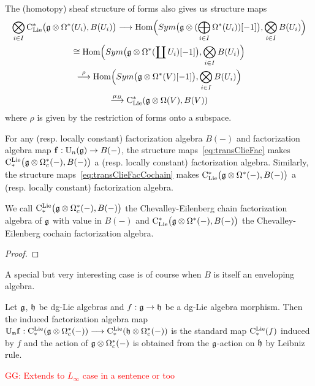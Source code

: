 \documentclass[11pt]{amsart}
\numberwithin{equation}{section}
\def\greg{\textcolor{red}{GG: }\textcolor{red}}
\begin{document}
\smallskip

The (homotopy) sheaf structure of forms also gives us structure maps
\begin{multline}\label{eq:transClieFacCochain}
 \bigotimes_{i\in I} {\rm C}_{\rm Lie}^*\big(\mathfrak g \otimes \Omega^*(U_i), B(U_i) \big) \longrightarrow
  {\rm Hom}\Big(Sym\big(\mathfrak g\otimes (\bigoplus_{i\in I}  \Omega^*(U_i))[-1]\big),  \bigotimes\limits_{i\in I} B(U_i) \Big) \\
 \cong {\rm Hom}\Big(Sym\big(\mathfrak g\otimes \Omega^*(\coprod U_i)[-1]\big), \bigotimes\limits_{i\in I} B(U_i) \Big) \\
 \stackrel{\rho}\longrightarrow {\rm Hom}\Big(Sym\big(\mathfrak g\otimes \Omega^*(V)[-1]\big), \bigotimes\limits_{i\in I} B(U_i) \Big) \\
 \stackrel{\mu_B}\longrightarrow 
  {\rm C}_{\rm Lie}^*(\mathfrak g\otimes \Omega (V), B(V))
\end{multline}
where $\rho$ is given by the restriction of forms onto a subspace. 
\begin{lmm}\label{L:ClieFacDef} For any (resp. locally constant) factorization algebra $B(-)$ and factorization algebra map $\mathbf{f}:\mathbb U_n(\mathfrak g) \to B(-)$, 
 the structure maps~\eqref{eq:transClieFac} makes $ {\rm C}^{\rm Lie}_*\big(\mathfrak g \otimes \Omega^*_c(-), B(-) \big)$ a (resp. locally constant) factorization algebra.
 Similarly, the structure maps~\eqref{eq:transClieFacCochain} makes 
 $ {\rm C}_{\rm Lie}^*\big(\mathfrak g \otimes \Omega^*(-), B(-) \big)$ a (resp. locally constant) factorization algebra.
\end{lmm}
\begin{dfn}\label{dfn:CEofFact}
We {call   ${\rm C}^{\rm Lie}_*\big(\mathfrak g \otimes \Omega^*_c(-), B(-) \big)$ the Chevalley-Eilenberg chain factorization algebra of $\mathfrak g$ with value in $B(-)$} 
and ${\rm C}_{\rm Lie}^*\big(\mathfrak g \otimes \Omega^*(-), B(-) \big)$ the Chevalley-Eilenberg cochain factorization algebra.
\end{dfn}
\begin{proof}
 
\end{proof}


A special but very interesting case is of course when $B$ is itself an enveloping algebra. 
\begin{cor}
 Let $\mathfrak g$, $\mathfrak h$ be dg-Lie algebras and $f:\mathfrak g\to \mathfrak h$ be a dg-Lie algebra morphism. 
 Then the induced factorization algebra map $\mathbf{\mathbb U_n f}:  {\rm C}^{\rm Lie}_*( \mathfrak g \otimes \Omega^*_c(-)) \longrightarrow  {\rm C}^{\rm Lie}_*( \mathfrak h \otimes \Omega^*_c(-)) $
 is the standard map ${\rm C}^{\rm Lie}_*(f)$ induced by $f$ and the action of $\mathfrak g  \otimes \Omega^*_c(-)$ is obtained from the $\mathfrak g$-action on $\mathfrak h$ by Leibniz rule.
\end{cor}
\begin{rmk}\greg{Extends to $L_\infty$ case in a sentence or too}
\end{rmk}
\end{document}
